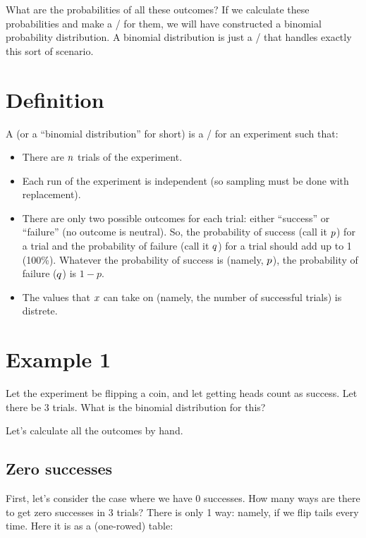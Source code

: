 \documentclass[../../../main.tex]{subfiles}
\begin{document}
What are the probabilities of all these outcomes? If we calculate these probabilities and make a \PDFtext/ for them, we will have constructed a binomial probability distribution. A binomial distribution is just a \PDFtext/ that handles exactly this sort of scenario.


\section{Definition}

A  (or a ``binomial distribution'' for short) is a \PDFtext/ for an experiment such that:

\begin{itemize}
  \item There are $\numTrials/$ trials of the experiment.
  \item Each run of the experiment is independent (so sampling must be done with replacement).
  \item There are only two possible outcomes for each trial: either ``success'' or ``failure'' (no outcome is neutral). So, the probability of success (call it $\success/$) for a trial and the probability of failure (call it $\failure/$) for a trial should add up to 1 (100\%). Whatever the probability of success is (namely, $\success/$), the probability of failure ($\failure/$) is $1 - p$.
  \item The values that $\RandVarVal/$ can take on (namely, the number of successful trials) is distrete.
\end{itemize}


\section{Example 1}

Let the experiment be flipping a coin, and let getting heads count as success. Let there be 3 trials. What is the binomial distribution for this?

Let's calculate all the outcomes by hand. 


\subsection{Zero successes}

First, let's consider the case where we have 0 successes. How many ways are there to get zero successes in 3 trials? There is only 1 way: namely, if we flip tails every time. Here it is as a (one-rowed) table:
\end{document}
